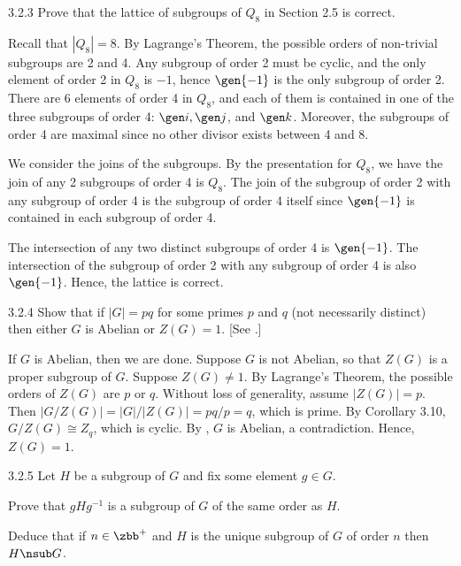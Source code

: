 \begin{exercise}{3.2.3}
    Prove that the lattice of subgroups of $Q_8$ in Section 2.5 is correct.
\end{exercise}

\begin{sol}
    Recall that $|Q_8| = 8$.
	By Lagrange's Theorem, the possible orders of non-trivial subgroups are 2 and 4.
	Any subgroup of order 2 must be cyclic, and the only element of order 2 in $Q_8$ is $-1$, hence $\gen{-1}$ is the only subgroup of order 2.
	There are 6 elements of order 4 in $Q_8$, and each of them is contained in one of the three subgroups of order 4: $\gen i, \gen j$, and $\gen k$.
	Moreover, the subgroups of order 4 are maximal since no other divisor exists between 4 and 8.

    We consider the joins of the subgroups.
	By the presentation for $Q_8$, we have the join of any 2 subgroups of order 4 is $Q_8$.
	The join of the subgroup of order 2 with any subgroup of order 4 is the subgroup of order 4 itself since $\gen{-1}$ is contained in each subgroup of order 4.

    The intersection of any two distinct subgroups of order 4 is $\gen{-1}$.
	The intersection of the subgroup of order 2 with any subgroup of order 4 is also $\gen{-1}$.
	Hence, the lattice is correct.
\end{sol}

\begin{exercise}{3.2.4}
    Show that if $|G| = pq$ for some primes $p$ and $q$ (not necessarily distinct) then either $G$ is Abelian or $Z(G) = 1$. [See .]
\end{exercise}

\begin{sol}
    If $G$ is Abelian, then we are done.
	Suppose $G$ is not Abelian, so that $Z(G)$ is a proper subgroup of $G$.
	Suppose $Z(G) \neq 1$.
	By Lagrange's Theorem, the possible orders of $Z(G)$ are $p$ or $q$.
	Without loss of generality, assume $|Z(G)| = p$.
	Then $|G/Z(G)| = |G|/|Z(G)| = pq/p = q$, which is prime.
	By Corollary 3.10, $G/Z(G) \cong Z_q$, which is cyclic.
	By , $G$ is Abelian, a contradiction.
	Hence, $Z(G) = 1$.
\end{sol}

\begin{spex}{3.2.5}
    Let $H$ be a subgroup of $G$ and fix some element $g \in G$. 
    \begin{subexercises}
        \item Prove that $gH g^{-1}$ is a subgroup of $G$ of the same order as $H$.
        \item Deduce that if $n \in \zbb^+$ and $H$ is the unique subgroup of $G$ of order $n$ then $H \nsub G$.
    \end{subexercises}
\end{spex}


